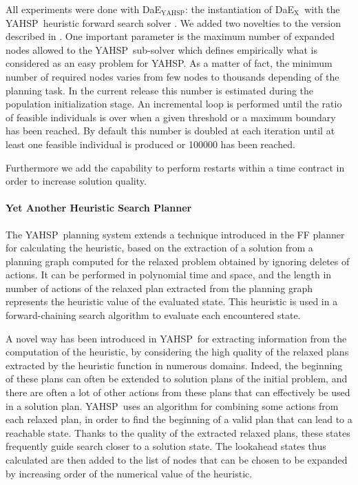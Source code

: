 \documentclass{sig-alternate}
\newcommand{\DAEX}{{\sc DaE$_{\text{X}}$}}
\newcommand{\DAEYAHSP}{{\sc DaE$_{\text{YAHSP}}$}}
\newcommand{\YAHSP}{{\sc YAHSP}}
\begin{document}
All experiments were done with \DAEYAHSP: the instantiation of \DAEX\ with the \YAHSP\ heuristic forward search solver \cite{yahsp:icaps2004}. 
We added two novelties to the version described in \cite{dae:icaps2010}.
One important parameter is the maximum number of expanded nodes allowed to the \YAHSP\ sub-solver which defines empirically what is
considered as an easy problem for \YAHSP. As a matter of fact, the minimum number of required nodes varies from few nodes to thousands depending of the
planning task. In the current release this number is estimated during the population initialization stage. An incremental loop is performed until the
ratio of feasible individuals is over when a given threshold or a maximum boundary has been reached. By default this number is doubled at each iteration until at least
one feasible individual is produced or 100000 has been reached.

Furthermore we add the capability to perform restarts within a time contract in order to increase solution quality.

\paragraph{Yet Another Heuristic Search Planner}
The \YAHSP\ planning system \cite{yahsp:icaps2004} extends a technique introduced in the FF planner
\cite{ff:jair01} for calculating the heuristic, based on the extraction of
a solution from a planning graph computed for the relaxed problem obtained by
ignoring deletes of actions. It can be performed in polynomial time and space,
and the length in number of actions of the relaxed plan extracted from the
planning graph represents the heuristic value of the evaluated state. This
heuristic is used in a forward-chaining search algorithm to evaluate each
encountered state.

A novel way has been introduced in \YAHSP\ for extracting information from the
computation of the heuristic, by considering the high quality of the relaxed
plans extracted by the heuristic function in numerous domains. Indeed, the
beginning of these plans can often be extended to solution plans of the initial
problem, and there are often a lot of other actions from these plans that can
effectively be used in a solution plan. \YAHSP\ uses an algorithm for combining
some actions from each relaxed plan, in order to find the beginning of a valid
plan that can lead to a reachable state. Thanks to the quality of the extracted
relaxed plans, these states frequently guide search closer to a solution
state. The lookahead states thus calculated are then added to the list of nodes
that can be chosen to be expanded by increasing order of the numerical value of
the heuristic.
\end{document}

